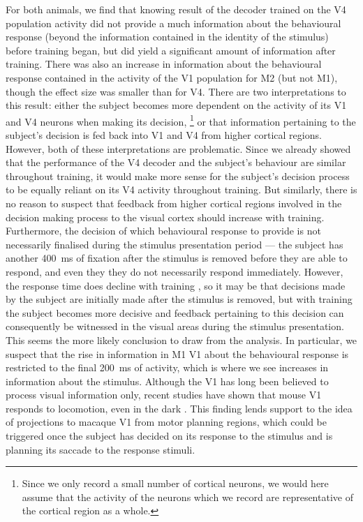 For both animals, we find that knowing result of the decoder trained on the \ac{V4} population activity did not provide a much information about the behavioural response (beyond the information contained in the identity of the stimulus) before training began, but did yield a significant amount of information after training.
There was also an increase in information about the behavioural response contained in the activity of the \ac{V1} population for \ac{M2} (but not \ac{M1}), though the effect size was smaller than for \ac{V4}.
There are two interpretations to this result: either the subject becomes more dependent on the activity of its \ac{V1} and \ac{V4} neurons when making its decision,%
\footnote{Since we only record a small number of cortical neurons, we would here assume that the activity of the neurons which we record are representative of the cortical region as a whole.}
or that information pertaining to the subject's decision is fed back into \ac{V1} and \ac{V4} from higher cortical regions.
However, both of these interpretations are problematic.
Since we already showed that the performance of the \ac{V4} decoder and the subject's behaviour are similar throughout training, it would make more sense for the subject's decision process to be equally reliant on its \ac{V4} activity throughout training.
But similarly, there is no reason to suspect that feedback from higher cortical regions involved in the decision making process to the visual cortex should increase with training.
Furthermore, the decision of which behavioural response to provide is not necessarily finalised during the stimulus presentation period --- the subject has another \SI{400}{\milli\second} of fixation after the stimulus is removed before they are able to respond, and even they they do not necessarily respond immediately.
However, the response time does decline with training \citep{Chen2013,Chen2013thesis}, so it may be that decisions made by the subject are initially made after the stimulus is removed, but with training the subject becomes more decisive and feedback pertaining to this decision can consequently be witnessed in the visual areas during the stimulus presentation.
This seems the more likely conclusion to draw from the analysis.
In particular, we suspect that the rise in information in \ac{M1} \ac{V1} about the behavioural response is restricted to the final \SI{200}{\milli\second} of activity, which is where we see increases in information about the stimulus.
Although the \acl{V1} has long been believed to process visual information only, recent studies have shown that mouse \ac{V1} responds to locomotion, even in the dark \citep{Pakan2016,Saleem2013,Keller2012}.
This finding lends support to the idea of projections to macaque \ac{V1} from motor planning regions, which could be triggered once the subject has decided on its response to the stimulus and is planning its saccade to the response stimuli.


